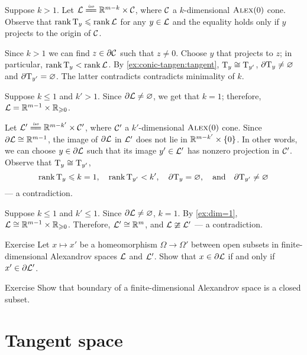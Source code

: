Suppose $k>1$.
Let $\spc{L}\iso \RR^{m-k}\times \spc{C}$, where $\mathcal{C}$ a $k$-dimensional $\textsc{Alex}(0)$ cone.
Observe that $\operatorname{\rm rank}\nolimits\mathrm{T}_y\leqslant\operatorname{\rm rank}\nolimits\mathcal{L}$ for any $y\in\mathcal{L}$ and the equality holds only if $y$ projects to the origin of $\mathcal{C}$.

Since $k>1$ we can find $z\in\partial\mathcal{C}$ such that $z\ne 0$.
Choose $y$ that projects to $z$;
in particular, $\operatorname{\rm rank}\nolimits\mathrm{T}_y<\operatorname{\rm rank}\nolimits\mathcal{L}$.
By \ref{ex:conic-tangen:tangent}, $\mathrm{T}_y\cong\mathrm{T}_{y'}$,
$\partial  \mathrm{T}_y\ne\varnothing$ and $\partial \mathrm{T}_{y'}=\varnothing$.
The latter contradicts contradicts minimality of $k$.

 Suppose $k\le1$ and $k'>1$.
Since $\partial \mathcal{L}\ne \varnothing$, we get that $k=1$;
therefore, $\mathcal{L}=\mathbb{R}^{m-1}\times\mathbb{R}_{\geqslant0}$.

Let $\spc{L}'\iso \RR^{m-k'}\times \spc{C}'$, where $\mathcal{C}'$ a $k'$-dimensional $\textsc{Alex}(0)$ cone.
Since $\partial\mathcal{L}\cong\mathbb{R}^{m-1}$,
the image of $\partial\mathcal{L}$ in $\mathcal{L}'$ does not lie in $\RR^{m-k'}\z\times\{0\}$.
In other words, we can choose $y\in \partial \mathcal{L}$ such that its image $y'\in \mathcal{L}'$ has nonzero projection in $\mathcal{C}'$.
Observe that $\mathrm{T}_y\cong\mathrm{T}_{y'}$,
\[
\operatorname{\rm rank}\nolimits\mathrm{T}_y\leqslant k=1,
\quad
\operatorname{\rm rank}\nolimits\mathrm{T}_{y'}< k',
\quad
\partial \mathrm{T}_y=\varnothing,
\quad\text{and}\quad
\partial \mathrm{T}_{y'}\ne \varnothing\]
--- a contradiction.

Suppose $k\le 1$ and $k'\le 1$.
Since $\partial \mathcal{L}\ne \varnothing$, $k=1$.
By \ref{ex:dim=1}, $\mathcal{L}\cong \mathbb{R}^{m-1}\times\mathbb{R}_{\geqslant0}$.
Therefore, $\mathcal{L}'\cong\mathbb{R}^m$, and $\mathcal{L}\ncong\mathcal{L}'$ --- a contradiction.
\qeds

\begin{thm}{Exercise}\label{ex:bry2bry}
Let $x\mapsto x'$ be a homeomorphism $\Omega\to\Omega'$
between open subsets in finite-dimensional Alexandrov spaces $\mathcal{L}$ and $\mathcal{L}'$.
Show that $x\in \partial \mathcal{L}$ if and only if $x'\in \partial \mathcal{L}'$.

\end{thm}

\begin{thm}{Exercise}\label{ex:bry-closed}
Show that boundary of a finite-dimensional Alexandrov space is a closed subset.
\end{thm}

\section{Tangent space}

